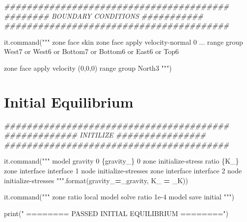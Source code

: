 \documentclass[a4paper, nobind]{templates/ociamthesis}
\newenvironment{Shaded}{\begin{snugshade}}{\end{snugshade}}
\newcommand{\BuiltInTok}[1]{#1}
\newcommand{\CommentTok}[1]{\textcolor[rgb]{0.56,0.35,0.01}{\textit{#1}}}
\newcommand{\NormalTok}[1]{#1}
\newcommand{\OperatorTok}[1]{\textcolor[rgb]{0.81,0.36,0.00}{\textbf{#1}}}
\newcommand{\SpecialCharTok}[1]{\textcolor[rgb]{0.00,0.00,0.00}{#1}}
\newcommand{\StringTok}[1]{\textcolor[rgb]{0.31,0.60,0.02}{#1}}
\renewenvironment{Shaded}
{
  \vspace{10pt}%
  \begin{snugshade}%
}{%
  \end{snugshade}%
  \vspace{8pt}%
}
\begin{document}
\begin{Shaded}
\begin{Highlighting}[]
\CommentTok{\#\#\#\#\#\#\#\#\#\#\#\#\#\#\#\#\#\#\#\#\#\#\#\#\#\#\#\#\#\#\#\#\#\#\#\#\#\#\#\#}
\CommentTok{\#\#\#\#\#\#\#\# BOUNDARY CONDITIONS \#\#\#\#\#\#\#\#\#\#\#}
\CommentTok{\#\#\#\#\#\#\#\#\#\#\#\#\#\#\#\#\#\#\#\#\#\#\#\#\#\#\#\#\#\#\#\#\#\#\#\#\#\#\#\#}

\NormalTok{it.command(}\StringTok{"""}
\StringTok{zone face skin}
\StringTok{zone face apply velocity{-}normal 0 ...}
\StringTok{range group \textquotesingle{}West7\textquotesingle{} or \textquotesingle{}West6\textquotesingle{} or \textquotesingle{}Bottom7\textquotesingle{} or \textquotesingle{}Bottom6\textquotesingle{} or \textquotesingle{}East6\textquotesingle{} or \textquotesingle{}Top6\textquotesingle{}}

\StringTok{zone face apply velocity (0,0,0) range group \textquotesingle{}North3\textquotesingle{}}
\StringTok{"""}\NormalTok{)}
\end{Highlighting}
\end{Shaded}

\hypertarget{initial-equilibrium}{%
\section{Initial Equilibrium}\label{initial-equilibrium}}

\begin{Shaded}
\begin{Highlighting}[]
\CommentTok{\#\#\#\#\#\#\#\#\#\#\#\#\#\#\#\#\#\#\#\#\#\#\#\#\#\#\#\#\#\#\#\#\#\#\#\#\#\#\#\#}
\CommentTok{\#\#\#\#\#\#\#\#\#\#\#\#\# INITILIZE \#\#\#\#\#\#\#\#\#\#\#\#\#\#\#\#}
\CommentTok{\#\#\#\#\#\#\#\#\#\#\#\#\#\#\#\#\#\#\#\#\#\#\#\#\#\#\#\#\#\#\#\#\#\#\#\#\#\#\#\#}

\NormalTok{it.command(}\StringTok{"""}
\StringTok{model gravity 0 }\SpecialCharTok{\{gravity\_\}}\StringTok{ 0}
\StringTok{zone initialize{-}stress ratio }\SpecialCharTok{\{K\_\}}
\StringTok{zone interface \textquotesingle{}interface 1\textquotesingle{} node initialize{-}stresses}
\StringTok{zone interface \textquotesingle{}interface 2\textquotesingle{} node initialize{-}stresses}
\StringTok{"""}\NormalTok{.}\BuiltInTok{format}\NormalTok{(gravity\_}\OperatorTok{=}\NormalTok{\_gravity, K\_ }\OperatorTok{=}\NormalTok{ \_K))}

\NormalTok{it.command(}\StringTok{"""}
\StringTok{zone ratio local}
\StringTok{model solve ratio 1e{-}4}
\StringTok{model save \textquotesingle{}initial\textquotesingle{}}
\StringTok{"""}\NormalTok{)}

\BuiltInTok{print}\NormalTok{(}\StringTok{"               ======== PASSED INITIAL EQUILIBRIUM ========"}\NormalTok{)}
\end{Highlighting}
\end{Shaded}
\end{document}
